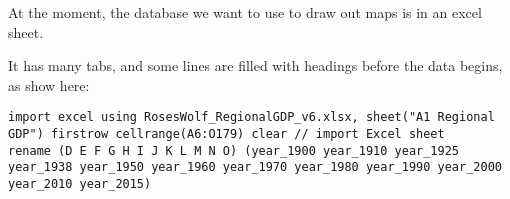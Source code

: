 \documentclass[
  letterpaper,
  DIV=11,
  numbers=noendperiod]{scrartcl}
\begin{document}
At the moment, the database we want to use to draw out maps is in an
excel sheet.

It has many tabs, and some lines are filled with headings before the
data begins, as show here:

\begin{verbatim}
import excel using RosesWolf_RegionalGDP_v6.xlsx, sheet("A1 Regional GDP") firstrow cellrange(A6:O179) clear // import Excel sheet
rename (D E F G H I J K L M N O) (year_1900 year_1910 year_1925 year_1938 year_1950 year_1960 year_1970 year_1980 year_1990 year_2000 year_2010 year_2015)
\end{verbatim}
\end{document}
